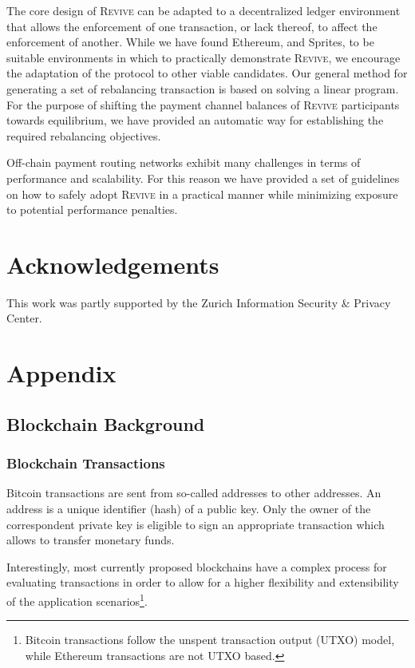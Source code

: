 \documentclass[sigconf]{acmart}
\newcommand{\name}{\textsc{Revive}\xspace}
\begin{document}
The core design of \name can be adapted to a decentralized ledger environment that allows the enforcement of one transaction, or lack thereof, to affect the enforcement of another. While we have found Ethereum, and Sprites, to be suitable environments in which to practically demonstrate \name, we encourage the adaptation of the protocol to other viable candidates.
Our general method for generating a set of rebalancing transaction is based on solving a linear program. For the purpose of shifting the payment channel balances of \name participants towards equilibrium, we have provided an automatic way for establishing the required rebalancing objectives.

Off-chain payment routing networks exhibit many challenges in terms of performance and scalability. For this reason we have provided a set of guidelines on how to safely adopt \name in a practical manner while minimizing exposure to potential performance penalties.

\section*{Acknowledgements}
This work was partly supported by the Zurich Information Security \& Privacy Center.




\section{Appendix}

\subsection{Blockchain Background}\label{sec:appendixblockchain}

\subsubsection{Blockchain Transactions}
Bitcoin transactions are sent from so-called addresses to other addresses. An address is a unique identifier (hash) of a public key. Only the owner of the correspondent private key is eligible to sign an appropriate transaction which allows to transfer monetary funds.

Interestingly, most currently proposed blockchains have a complex process for evaluating transactions in order to allow for a higher flexibility and extensibility of the application scenarios\footnote{Bitcoin transactions follow the unspent transaction output (UTXO) model, while Ethereum transactions are not UTXO based.}.
\end{document}
